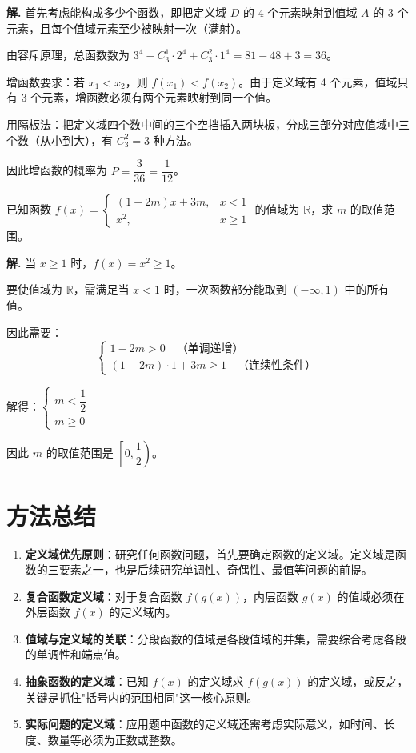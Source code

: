 \documentclass[11pt]{ctexrep}
\begin{document}
\textbf{解.} 首先考虑能构成多少个函数，即把定义域 $D$ 的 4 个元素映射到值域 $A$ 的 3 个元素，且每个值域元素至少被映射一次（满射）。

由容斥原理，总函数数为 $3^4 - C_3^1 \cdot 2^4 + C_3^2 \cdot 1^4 = 81 - 48 + 3 = 36$。

增函数要求：若 $x_1 < x_2$，则 $f(x_1) < f(x_2)$。由于定义域有 4 个元素，值域只有 3 个元素，增函数必须有两个元素映射到同一个值。

用隔板法：把定义域四个数中间的三个空挡插入两块板，分成三部分对应值域中三个数（从小到大），有 $C_3^2 = 3$ 种方法。

因此增函数的概率为 $P = \dfrac{3}{36} = \dfrac{1}{12}$。

\begin{example}[分段函数的定义域与值域]
    已知函数 $f(x) = \begin{cases} (1-2m)x + 3m, & x < 1 \\ x^2, & x \geq 1 \end{cases}$ 的值域为 $\mathbb{R}$，求 $m$ 的取值范围。
\end{example}

\textbf{解.} 当 $x \geq 1$ 时，$f(x) = x^2 \geq 1$。

要使值域为 $\mathbb{R}$，需满足当 $x < 1$ 时，一次函数部分能取到 $(-\infty, 1)$ 中的所有值。

因此需要：
\[
    \begin{cases}
        1 - 2m > 0 \quad \text{（单调递增）} \\[4pt]
        (1-2m) \cdot 1 + 3m \geq 1 \quad \text{（连续性条件）}
    \end{cases}
\]

解得：$\begin{cases} m < \dfrac{1}{2} \\ m \geq 0 \end{cases}$

因此 $m$ 的取值范围是 $\left[0, \dfrac{1}{2}\right)$。

\section*{方法总结}

\begin{enumerate}
    \item \textbf{定义域优先原则}：研究任何函数问题，首先要确定函数的定义域。定义域是函数的三要素之一，也是后续研究单调性、奇偶性、最值等问题的前提。
    \item \textbf{复合函数定义域}：对于复合函数 $f(g(x))$，内层函数 $g(x)$ 的值域必须在外层函数 $f(x)$ 的定义域内。
    \item \textbf{值域与定义域的关联}：分段函数的值域是各段值域的并集，需要综合考虑各段的单调性和端点值。
    \item \textbf{抽象函数的定义域}：已知 $f(x)$ 的定义域求 $f(g(x))$ 的定义域，或反之，关键是抓住"括号内的范围相同"这一核心原则。
    \item \textbf{实际问题的定义域}：应用题中函数的定义域还需考虑实际意义，如时间、长度、数量等必须为正数或整数。
\end{enumerate}
\end{document}
